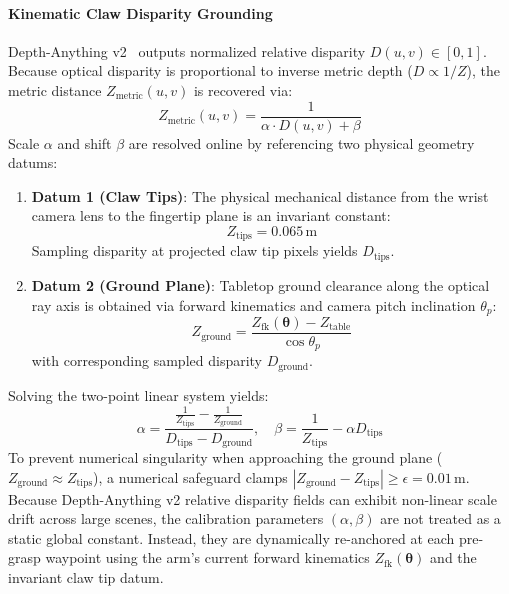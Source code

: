 \documentclass[journal]{IEEEtran}
\begin{document}
\paragraph{Kinematic Claw Disparity Grounding}
Depth-Anything v2~\cite{aria_052_yang_2024_depth,aria_009_murray_2025_assessing} outputs normalized relative disparity $D(u, v) \in [0, 1]$. Because optical disparity is proportional to inverse metric depth ($D \propto 1/Z$), the metric distance $Z_{\text{metric}}(u, v)$ is recovered via:
\begin{equation}
\label{eq_inverse_depth}
Z_{\text{metric}}(u, v) = \frac{1}{\alpha \cdot D(u, v) + \beta}
\end{equation}
Scale $\alpha$ and shift $\beta$ are resolved online by referencing two physical geometry datums:
\begin{enumerate}
    \item \textbf{Datum 1 (Claw Tips)}: The physical mechanical distance from the wrist camera lens to the fingertip plane is an invariant constant:
    \begin{equation}
    Z_{\text{tips}} = 0.065\,\text{m}
    \end{equation}
    Sampling disparity at projected claw tip pixels yields $D_{\text{tips}}$.
    \item \textbf{Datum 2 (Ground Plane)}: Tabletop ground clearance along the optical ray axis is obtained via forward kinematics and camera pitch inclination $\theta_p$:
    \begin{equation}
    Z_{\text{ground}} = \frac{Z_{\text{fk}}(\boldsymbol{\theta}) - Z_{\text{table}}}{\cos\theta_p}
    \end{equation}
    with corresponding sampled disparity $D_{\text{ground}}$.
\end{enumerate}
Solving the two-point linear system yields:
\begin{equation}
\alpha = \frac{\frac{1}{Z_{\text{tips}}} - \frac{1}{Z_{\text{ground}}}}{D_{\text{tips}} - D_{\text{ground}}}, \quad \beta = \frac{1}{Z_{\text{tips}}} - \alpha D_{\text{tips}}
\end{equation}
To prevent numerical singularity when approaching the ground plane ($Z_{\text{ground}} \approx Z_{\text{tips}}$), a numerical safeguard clamps $|Z_{\text{ground}} - Z_{\text{tips}}| \ge \epsilon = 0.01$\,m. Because Depth-Anything v2 relative disparity fields can exhibit non-linear scale drift across large scenes, the calibration parameters $(\alpha, \beta)$ are not treated as a static global constant. Instead, they are dynamically re-anchored at each pre-grasp waypoint using the arm's current forward kinematics $Z_{\text{fk}}(\boldsymbol{\theta})$ and the invariant claw tip datum. 
\end{document}
